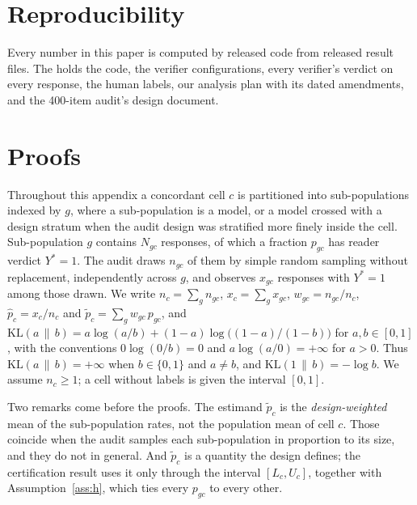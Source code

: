 \appendix

\section*{Reproducibility}

Every number in this paper is computed by released code from released result files. The
\SuppName{} holds the code, the verifier configurations, every verifier's verdict on
every response, the human labels, our analysis plan with its dated amendments, and the 400-item
audit's design document.

\section{Proofs}
\label{app:proofs}

Throughout this appendix a concordant cell $c$ is partitioned into sub-populations indexed by
$g$, where a sub-population is a model, or a model crossed with a design stratum when the
audit design was stratified more finely inside the cell. Sub-population $g$ contains $N_{gc}$
responses, of which a fraction $p_{gc}$ has reader verdict $Y^* = 1$. The audit draws
$n_{gc}$ of them by simple random sampling without replacement, independently across $g$, and
observes $x_{gc}$ responses with $Y^* = 1$ among those drawn. We write
$n_c = \sum_g n_{gc}$, $x_c = \sum_g x_{gc}$, $w_{gc} = n_{gc}/n_c$,
$\hat p_c = x_c / n_c$ and $\tilde p_c = \sum_g w_{gc}\, p_{gc}$, and
$\mathrm{KL}(a \,\|\, b) = a \log(a/b) + (1-a)\log\bigl((1-a)/(1-b)\bigr)$ for
$a, b \in [0,1]$, with the conventions $0 \log(0/b) = 0$ and $a \log(a/0) = +\infty$ for $a > 0$.
Thus $\mathrm{KL}(a \,\|\, b) = +\infty$ when $b \in \{0, 1\}$ and $a \ne b$, and
$\mathrm{KL}(1 \,\|\, b) = -\log b$. We assume $n_c \ge 1$; a cell without labels is given the interval
$[0,1]$.

Two remarks come before the proofs. The estimand $\tilde p_c$ is the
\emph{design-weighted} mean of the sub-population rates, not the population mean of cell $c$.
Those coincide when the audit samples each sub-population in proportion to its size, and they
do not in general. And $\tilde p_c$ is a quantity the design defines; the certification result
uses it only through the interval $[L_c, U_c]$, together with
Assumption~\ref{ass:h}, which ties every $p_{gc}$ to every other.

